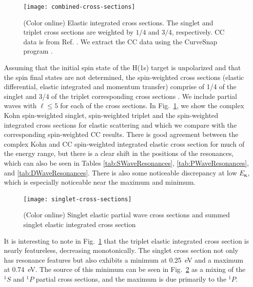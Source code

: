 \documentclass[preprint,showpacs,showkeys,preprintnumbers,amsmath,amssymb,longbibliography,pra,aps]{revtex4-1}
\begin{document}
{\begin{figure}[H]
	\centering
	\texttt{[image: combined-cross-sections]}
	\caption{(Color online) Elastic integrated cross sections. The singlet and
triplet cross sections are weighted by $1/4$ and $3/4$,
respectively. CC data is from Ref. \cite{Walters2004}.
We extract the CC data using the
CurveSnap program \cite{CurveSnap}.}
	\label{fig:combined-cross-sections}
\end{figure}

Assuming that the initial spin state of the H(1s) target is unpolarized and 
that the spin final states are not determined, the spin-weighted cross 
sections (elastic differential, elastic integrated and momentum transfer) 
comprise of 1/4 of the singlet and 3/4 of the triplet corresponding cross 
sections \cite{Blackwood2002,Joachain1979,Ray1996}.
We include partial waves with $\ell \leq 5$ for each of the cross sections. 
In Fig.~\ref{fig:combined-cross-sections}, we show the complex Kohn
spin-weighted singlet, spin-weighted triplet and the spin-weighted integrated 
cross sections for elastic scattering and which we compare with the
corresponding spin-weighted CC results.
There is good agreement between the complex Kohn and CC spin-weighted
integrated elastic cross section for much of the energy range, but there is a 
clear shift in the positions of the resonances, which can also be seen in 
Tables \ref{tab:SWaveResonances}, \ref{tab:PWaveResonances}, and
\ref{tab:DWaveResonances}. There is also some noticeable discrepancy at low
$E_{\bm \kappa}$, which is especially noticeable near the maximum and minimum.

\begin{figure}[H]
	\centering
	\texttt{[image: singlet-cross-sections]}
	\caption{(Color online) Singlet elastic partial wave cross
sections and summed singlet elastic integrated cross section}
	\label{fig:singlet-cross-sections}
\end{figure}

It is interesting to note in Fig.~\ref{fig:combined-cross-sections} that the
triplet elastic integrated cross section is nearly featureless, decreasing
monotonically. The singlet cross section not only has resonance
features but also exhibits a minimum at 0.25~eV and a maximum at 0.74~eV.
The source of this minimum can be seen in
Fig.~\ref{fig:singlet-cross-sections} as a mixing of the $^1S$ and $^1P$
partial cross sections, and the maximum is due primarily to the $^1P$.

}
\end{document}

